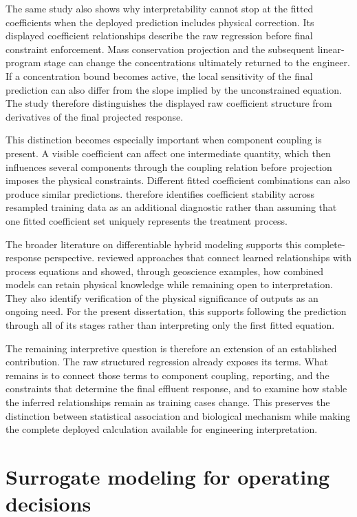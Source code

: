 The same study also shows why interpretability cannot stop at the fitted coefficients when the deployed prediction includes physical correction. Its displayed coefficient relationships describe the raw regression before final constraint enforcement. Mass conservation projection and the subsequent linear-program stage can change the concentrations ultimately returned to the engineer. If a concentration bound becomes active, the local sensitivity of the final prediction can also differ from the slope implied by the unconstrained equation. The study therefore distinguishes the displayed raw coefficient structure from derivatives of the final projected response.

This distinction becomes especially important when component coupling is present. A visible coefficient can affect one intermediate quantity, which then influences several components through the coupling relation before projection imposes the physical constraints. Different fitted coefficient combinations can also produce similar predictions. \citet{Selerio2026} therefore identifies coefficient stability across resampled training data as an additional diagnostic rather than assuming that one fitted coefficient set uniquely represents the treatment process.

The broader literature on differentiable hybrid modeling supports this complete-response perspective. \citet{Shen2023} reviewed approaches that connect learned relationships with process equations and showed, through geoscience examples, how combined models can retain physical knowledge while remaining open to interpretation. They also identify verification of the physical significance of outputs as an ongoing need. For the present dissertation, this supports following the prediction through all of its stages rather than interpreting only the first fitted equation.

The remaining interpretive question is therefore an extension of an established contribution. The raw structured regression already exposes its terms. What remains is to connect those terms to component coupling, reporting, and the constraints that determine the final effluent response, and to examine how stable the inferred relationships remain as training cases change. This preserves the distinction between statistical association and biological mechanism while making the complete deployed calculation available for engineering interpretation.

\section{Surrogate modeling for operating decisions}

